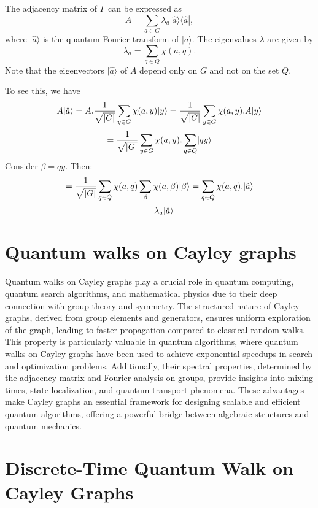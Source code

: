\documentclass[11pt]{article}
\theoremstyle{definition}
\begin{document}
The adjacency matrix of $\Gamma$ can be expressed as
\[
A = \sum_{a \in G} \lambda_a |\hat{a}\rangle \langle \hat{a}|,
\]
where $|\hat{a}\rangle$ is the quantum Fourier transform of $|a\rangle$. The eigenvalues $\lambda$ are given by
\[
\lambda_a = \sum_{q \in Q} \chi(a, q).
\]
Note that the eigenvectors $|\hat{a}\rangle$ of $A$ depend only on $G$ and not on the set $Q$.

To see this, we have
\[
        A\lvert\hat{a}\rangle = A.\frac{1}{\sqrt{|G|}}\sum_{y \in G}\chi(a,y)\lvert y\rangle = \frac{1}{\sqrt{|G|}}\sum_{y \in G}\chi(a,y).A\lvert y\rangle
        \]
        \[
        = \frac{1}{\sqrt{|G|}}\sum_{y \in G}\chi(a,y).\sum_{q \in Q}\lvert qy\rangle
        \]
        Consider $\beta = qy$. Then:
        \[
         = \frac{1}{\sqrt{|G|}}\sum_{q \in Q}\chi(a,q)\sum_{\beta}\chi(a,\beta)\lvert\beta\rangle = \sum_{q \in Q}\chi(a,q) . \lvert\hat{a}\rangle
        \]
        \[
         = \lambda_a\lvert\hat{a}\rangle
        \]




\section*{Quantum walks on Cayley graphs}
Quantum walks on Cayley graphs play a crucial role in quantum computing, quantum search algorithms, and mathematical physics due to their deep connection with group theory and symmetry. The structured nature of Cayley graphs, derived from group elements and generators, ensures uniform exploration of the graph, leading to faster propagation compared to classical random walks. This property is particularly valuable in quantum algorithms, where quantum walks on Cayley graphs have been used to achieve exponential speedups in search and optimization problems. Additionally, their spectral properties, determined by the adjacency matrix and Fourier analysis on groups, provide insights into mixing times, state localization, and quantum transport phenomena. These advantages make Cayley graphs an essential framework for designing scalable and efficient quantum algorithms, offering a powerful bridge between algebraic structures and quantum mechanics.






\section*{Discrete-Time Quantum Walk on Cayley Graphs}
\end{document}
